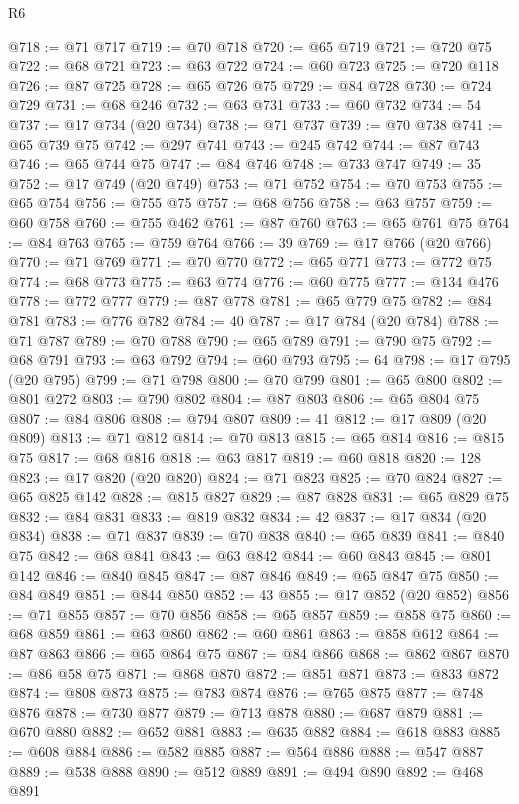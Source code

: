 \begin{lexlean}{R6}
\begin{coremodule}
@718 := @71 @717
@719 := @70 @718
@720 := @65 @719
@721 := @720 @75
@722 := @68 @721
@723 := @63 @722
@724 := @60 @723
@725 := @720 @118
@726 := @87 @725
@728 := @65 @726 @75
@729 := @84 @728
@730 := @724 @729
@731 := @68 @246
@732 := @63 @731
@733 := @60 @732
@734 := 54
@737 := @17 @734 (@20 @734)
@738 := @71 @737
@739 := @70 @738
@741 := @65 @739 @75
@742 := @297 @741
@743 := @245 @742
@744 := @87 @743
@746 := @65 @744 @75
@747 := @84 @746
@748 := @733 @747
@749 := 35
@752 := @17 @749 (@20 @749)
@753 := @71 @752
@754 := @70 @753
@755 := @65 @754
@756 := @755 @75
@757 := @68 @756
@758 := @63 @757
@759 := @60 @758
@760 := @755 @462
@761 := @87 @760
@763 := @65 @761 @75
@764 := @84 @763
@765 := @759 @764
@766 := 39
@769 := @17 @766 (@20 @766)
@770 := @71 @769
@771 := @70 @770
@772 := @65 @771
@773 := @772 @75
@774 := @68 @773
@775 := @63 @774
@776 := @60 @775
@777 := @134 @476
@778 := @772 @777
@779 := @87 @778
@781 := @65 @779 @75
@782 := @84 @781
@783 := @776 @782
@784 := 40
@787 := @17 @784 (@20 @784)
@788 := @71 @787
@789 := @70 @788
@790 := @65 @789
@791 := @790 @75
@792 := @68 @791
@793 := @63 @792
@794 := @60 @793
@795 := 64
@798 := @17 @795 (@20 @795)
@799 := @71 @798
@800 := @70 @799
@801 := @65 @800
@802 := @801 @272
@803 := @790 @802
@804 := @87 @803
@806 := @65 @804 @75
@807 := @84 @806
@808 := @794 @807
@809 := 41
@812 := @17 @809 (@20 @809)
@813 := @71 @812
@814 := @70 @813
@815 := @65 @814
@816 := @815 @75
@817 := @68 @816
@818 := @63 @817
@819 := @60 @818
@820 := 128
@823 := @17 @820 (@20 @820)
@824 := @71 @823
@825 := @70 @824
@827 := @65 @825 @142
@828 := @815 @827
@829 := @87 @828
@831 := @65 @829 @75
@832 := @84 @831
@833 := @819 @832
@834 := 42
@837 := @17 @834 (@20 @834)
@838 := @71 @837
@839 := @70 @838
@840 := @65 @839
@841 := @840 @75
@842 := @68 @841
@843 := @63 @842
@844 := @60 @843
@845 := @801 @142
@846 := @840 @845
@847 := @87 @846
@849 := @65 @847 @75
@850 := @84 @849
@851 := @844 @850
@852 := 43
@855 := @17 @852 (@20 @852)
@856 := @71 @855
@857 := @70 @856
@858 := @65 @857
@859 := @858 @75
@860 := @68 @859
@861 := @63 @860
@862 := @60 @861
@863 := @858 @612
@864 := @87 @863
@866 := @65 @864 @75
@867 := @84 @866
@868 := @862 @867
@870 := @86 @58 @75
@871 := @868 @870
@872 := @851 @871
@873 := @833 @872
@874 := @808 @873
@875 := @783 @874
@876 := @765 @875
@877 := @748 @876
@878 := @730 @877
@879 := @713 @878
@880 := @687 @879
@881 := @670 @880
@882 := @652 @881
@883 := @635 @882
@884 := @618 @883
@885 := @608 @884
@886 := @582 @885
@887 := @564 @886
@888 := @547 @887
@889 := @538 @888
@890 := @512 @889
@891 := @494 @890
@892 := @468 @891

\end{coremodule}
\end{lexlean}
